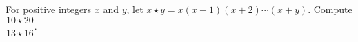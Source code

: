 For positive integers $x$ and $y$, let $x\star y=x(x+1)(x+2)\cdots(x+y)$. Compute $\dfrac{10\star20}{13\star16}$.
